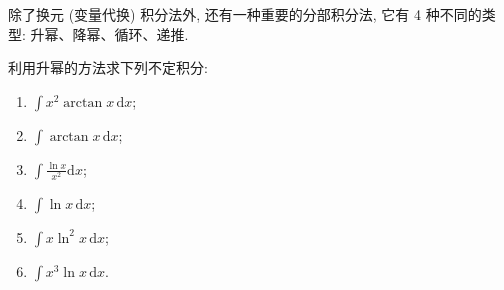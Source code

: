 除了换元 (变量代换) 积分法外, 还有一种重要的分部积分法, 它有 4 种不同的类型: 升幂、降幂、循环、递推.

\begin{example}\label{ex:5.2.10}
利用升幂的方法求下列不定积分:
\begin{enumerate}[label=(\arabic*)]
  \item $\int x^{2}\arctan x\,\mathrm{d}x$;
  \item $\int\arctan x\,\mathrm{d}x$;
  \item $\int\frac{\ln x}{x^{2}}\mathrm{d}x$;
  \item $\int\ln x\,\mathrm{d}x$;
  \item $\int x\ln^{2}x\,\mathrm{d}x$;
  \item $\int x^{3}\ln x\,\mathrm{d}x$.
\end{enumerate}
\end{example}

